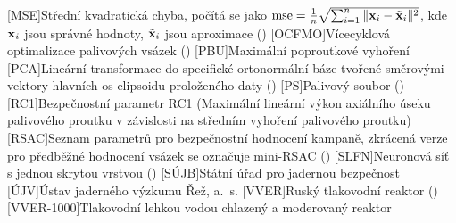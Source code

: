\begin{acronym}[TDMA]
[MSE]{Střední kvadratická chyba, počítá se jako $\mathrm{mse} = \frac{1}{n} \sqrt{\sum_{i=1}^n \|\mathbf{x}_{i} - \tilde{\mathbf{x}}_i \|^2}$, kde $\mathbf{x}_i$ jsou správné hodnoty, $\tilde{\mathbf{x}}_i$ jsou aproximace ()}
[OCFMO]{Vícecyklová optimalizace palivových vsázek ()}
[PBU]{Maximální poproutkové vyhoření}
[PCA]{Lineární transformace do specifické ortonormální báze tvořené směrovými vektory hlavních os elipsoidu proloženého daty ()}
[PS]{Palivový soubor ()}
[RC1]{Bezpečnostní parametr RC1 (Maximální lineární výkon axiálního úseku palivového proutku v závislosti na středním vyhoření palivového proutku)}
[RSAC]{Seznam parametrů pro bezpečnostní hodnocení kampaně, zkrácená verze pro předběžné hodnocení vsázek se označuje mini-RSAC ()}
[SLFN]{Neuronová síť s jednou skrytou vrstvou ()}
[SÚJB]{Státní úřad pro jadernou bezpečnost}
[ÚJV]{Ústav jaderného výzkumu Řež, a.~s.}
[VVER]{Ruský tlakovodní reaktor ()}
[VVER-1000]{Tlakovodní lehkou vodou chlazený a moderovaný reaktor}
\end{acronym}
